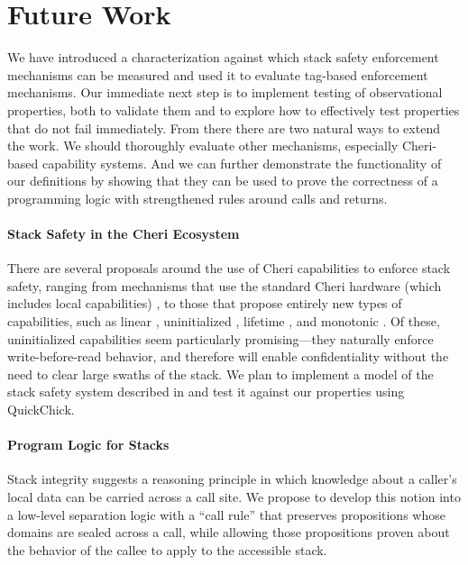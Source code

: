 \documentclass[acmsmall,review,anonymous]{acmart}\settopmatter{printfolios=true,printccs=false,printacmref=false}
\begin{document}
{\section{Future Work}
\label{sec:future}

We have introduced a characterization against which stack safety enforcement
mechanisms can be measured and used it to evaluate tag-based enforcement mechanisms.
Our immediate next step is to implement testing of observational properties,
both to validate them and to explore how to effectively test properties that do not
fail immediately.
From there there are two natural ways to extend the work. We should thoroughly evaluate
other mechanisms, especially Cheri-based capability systems. And we can further demonstrate
the functionality of our definitions by showing that they can be used to prove
the correctness of a programming logic with strengthened rules around calls and returns.

\paragraph*{Stack Safety in the Cheri Ecosystem}

There are several proposals around the use of Cheri capabilities to enforce stack safety,
ranging from mechanisms that use the standard Cheri hardware (which includes local
capabilities) \citep{SkorstengaardLocal},
to those that propose entirely new types of capabilities, such as linear
\citep{SkorstengaardSTK}, uninitialized \citep{Georges+21}, lifetime \citep{Tsampas+19}, and monotonic \citep{GeorgesComplete}.
Of these, uninitialized capabilities seem particularly promising---they naturally enforce
write-before-read behavior, and therefore will enable confidentiality without the need
to clear large swaths of the stack. We plan to implement a model of the stack safety
system described in \citet{Georges+21} and test it against our properties using
QuickChick.

\paragraph*{Program Logic for Stacks}

Stack integrity suggests a reasoning principle in which knowledge about a caller's
local data can be carried across a call site. We propose to develop this notion
into a low-level separation logic with a ``call rule'' that preserves propositions
whose domains are sealed across a call, while allowing those propositions proven
about the behavior of the callee to apply to the accessible stack.

}
\end{document}
